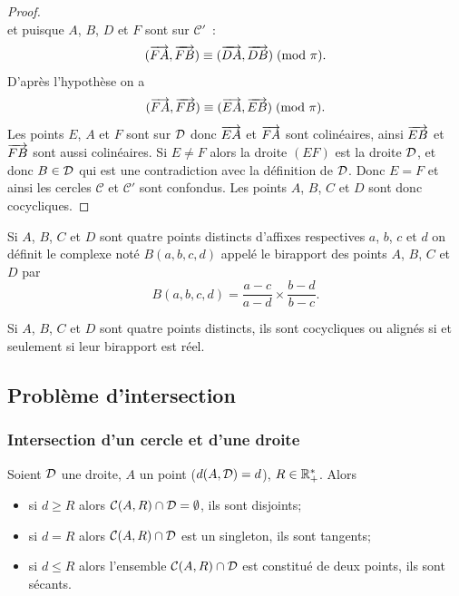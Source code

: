 \begin{proof}
\begin{equation}
  \end{equation}
  et puisque \(A\), \(B\), \(D\) et \(F\) sont sur \(\mathcal{C}'\)~:
  \begin{equation}
    (\overrightarrow{FA},\overrightarrow{FB}) \equiv (\overrightarrow{DA},\overrightarrow{DB})\!\pmod {\pi}.
  \end{equation}
  D'après l'hypothèse on a \begin{equation}
    (\overrightarrow{FA},\overrightarrow{FB}) \equiv (\overrightarrow{EA},\overrightarrow{EB})\!\pmod {\pi}.
  \end{equation}
  Les points \(E\), \(A\) et \(F\) sont sur \(\mathcal{D}\) donc \(\overrightarrow{EA}\) et 
  \(\overrightarrow{FA}\) sont colinéaires, ainsi \(\overrightarrow{EB}\) et \(\overrightarrow{FB}\) sont 
  aussi colinéaires. Si \(E \neq F\) alors la droite \((EF)\) est la droite 
  \(\mathcal{D}\), et donc \(B \in \mathcal{D}\) qui est une contradiction avec la définition 
  de \(\mathcal{D}\). Donc \(E = F\) et ainsi les cercles \(\mathcal{C}\) et 
  \(\mathcal{C}'\) sont confondus. Les points \(A\), \(B\), \(C\) et \(D\) 
  sont donc cocycliques.
\end{proof}

\begin{defdef}[Birapport]
  Si \(A\), \(B\), \(C\) et \(D\) sont quatre points distincts d'affixes 
  respectives \(a\), \(b\), \(c\) et \(d\) on définit le complexe noté \(B(a , 
  b , c , d)\) appelé le birapport des points \(A\), \(B\), \(C\) et \(D\) par
  \begin{equation}
    B(a , b , c , d) = \frac{a - c}{a - d} \times \frac{b - d}{b - c}.
  \end{equation}
\end{defdef}

\begin{theo}
  Si \(A\), \(B\), \(C\) et \(D\) sont quatre points distincts, ils sont 
  cocycliques ou alignés si et seulement si leur birapport est réel.
\end{theo}

\subsection{Problème d'intersection}

\subsubsection{Intersection d'un cercle et d'une droite}

\begin{prop}
  Soient \(\mathcal{D}\) une droite, \(A\) un point (\(d(A , \mathcal{D}) = d\)), \(R \in 
  \mathbb{R}_{+}^{*}\). Alors
  \begin{itemize}
    \item si \(d \geqslant R\) alors \(\mathcal{C}(A,R) \cap \mathcal{D} = \emptyset\), 
      ils sont disjoints;
    \item si \(d = R\) alors \(\mathcal{C}(A,R) \cap \mathcal{D}\) est un singleton, ils 
      sont tangents;
    \item si \(d\leqslant R\) alors l'ensemble \(\mathcal{C}(A,R) \cap \mathcal{D}\) est 
      constitué de deux points, ils sont sécants.
  \end{itemize}
\end{prop}

